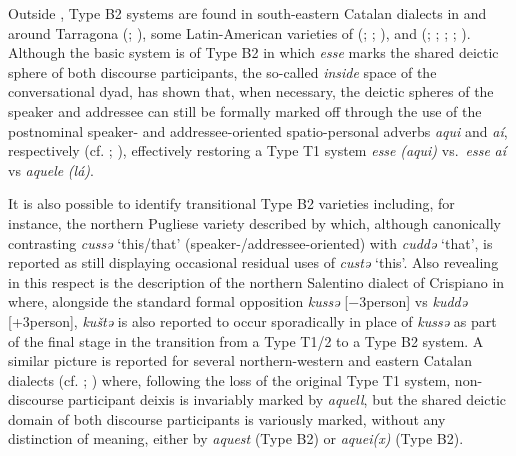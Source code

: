 \documentclass[output=paper]{langsci/langscibook}
\begin{document}
Outside , Type B2 systems are found in south-eastern
Catalan dialects in and around Tarragona
(\citealt[141]{Badia-i-Margarit:1991a}; \citealt[501]{Badia-i-Margarit:1995a}),
some Latin-American varieties of  (\citealt[170]{Kany:1945a};
\citealt[434]{Zamora-Vicente:1967a}; \citealt[42, 44]{Stavinschi:2009a}), and
 (\citealt{Camara:1971a}; \citealt[114f]{Teyssier:1976a};
\citealt{Jungbluth:2000a}; \citealt[§5]{Jungbluth:2017a};
\citealt[317--319]{Jungbluth:2015a}). Although the basic 
system is of Type B2 in which \emph{esse} marks the shared deictic
sphere of both discourse participants, the so-called \emph{inside} space of the
conversational dyad, \citet{Jungbluth:2000a} has shown that, when necessary,
the deictic spheres of the speaker and addressee can still be formally marked
off through the use of the postnominal speaker- and addressee-oriented
spatio-personal adverbs \emph{aqui} and \emph{aí}, respectively (cf.
\citealt[27--51]{Carvalho:1976a}; \citealt[317]{Jungbluth:2015a}), effectively
restoring a Type T1 system \emph{esse} \emph{(aqui)} vs.\ \emph{esse} \emph{aí}
vs \emph{aquele} \emph{(lá)}.

It is also possible to identify transitional Type B2 varieties
including, for instance, the northern Pugliese variety described by
\citet[201]{Imperio:1990a} which, although canonically contrasting \emph{cussə}
‘this/that’ (speaker-/addressee-oriented) with \emph{cuddə} ‘that’, is reported
as still displaying occasional residual uses of \emph{custə} ‘this’. Also
revealing in this respect is the description of the northern Salentino dialect
of Crispiano in \citet[155]{Mancarella:1998a} where, alongside the standard
formal opposition \emph{kussə} [−3person] vs \emph{kuddə}
[+3person], \emph{kuštə} is also reported to occur sporadically in place of
\emph{kussə} as part of the final stage in the transition from a Type T1/2 to a
Type B2 system. A similar picture is reported for several
northern-western and eastern Catalan dialects (cf.
\citealt[81]{Duarte-i-Montserrat:1986a}; \citealt[250]{Veny:1991a}) where,
following the loss of the original Type T1 system, non-discourse participant
deixis is invariably marked by \emph{aquell}, but the shared deictic domain of
both discourse participants is variously marked, without any distinction of
meaning, either by \emph{aquest} (Type B2) or \emph{aquei(x)} (Type
B2).
\end{document}
